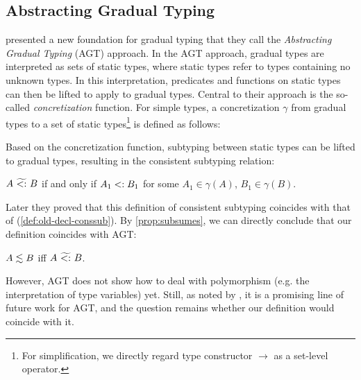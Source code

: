 \subsection{Abstracting Gradual Typing}
\label{subsec:agt}

\citet{garcia2016abstracting} presented a new foundation for gradual typing that
they call the \textit{Abstracting Gradual Typing} (AGT) approach. In the AGT
approach, gradual types are interpreted as sets of static types, where static
types refer to types containing no unknown types. In this interpretation,
predicates and functions on static types can then be lifted to apply to gradual
types. Central to their approach is the so-called \textit{concretization}
function. For simple types, a concretization $\gamma$ from gradual types to a
set of static types\footnote{For simplification, we directly regard type
  constructor $\to$ as a set-level operator.} is defined as follows:

\begin{definition}[Concretization]
  \label{def:concret}
\end{definition}

Based on the concretization function, subtyping between static types can be
lifted to gradual types, resulting in the consistent subtyping relation:
\begin{definition}
  \label{def:agt-conssub}
  $A ~\widetilde{<:}~ B$ if and only if $A_1 <: B_1$ for some $A_1 \in \gamma(A)$, $B_1 \in \gamma(B)$.
\end{definition}

Later they proved that this definition of consistent subtyping coincides with
that of \citet{siek2007gradual} (\cref{def:old-decl-conssub}). By
\cref{prop:subsumes}, we can directly conclude that our definition coincides with AGT:

\begin{proposition}
  \label{lemma:coincide-agt}
  $A \lesssim B$ iff $A ~\widetilde{<:}~ B$.
\end{proposition}

However, AGT does not show how to deal with polymorphism (e.g. the
interpretation of type variables) yet.
Still, as noted by \citet{garcia2016abstracting},
it is a promising line of future work for
AGT, and the question remains whether our definition would coincide with it.

